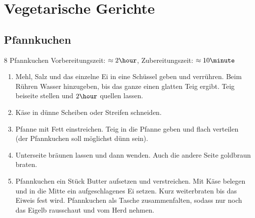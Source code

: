 \chapter{Vegetarische Gerichte}
\section{Pfannkuchen}
8 Pfannkuchen \hfill Vorbereitungszeit: $\approx 2 \hour$, Zubereitungszeit: $\approx10 \minute$
\hspace{0em}\\
\begin{enumerate}
\item   Mehl, Salz und das einzelne Ei in eine Schüssel geben und verrühren.
        Beim Rühren Wasser hinzugeben, bis das ganze einen glatten Teig ergibt.
        Teig beiseite stellen und $2 \hour$ quellen lassen.
\item   Käse in dünne Scheiben oder Streifen schneiden.
\item   Pfanne mit Fett einstreichen.
        Teig in die Pfanne geben und flach verteilen (der Pfannkuchen soll möglichst dünn sein).
\item   Unterseite bräunen lassen und dann wenden.
        Auch die andere Seite goldbraun braten.
\item   Pfannkuchen ein Stück Butter aufsetzen und verstreichen.
        Mit Käse belegen und in die Mitte ein aufgeschlagenes Ei setzen.
        Kurz weiterbraten bis das Eiweis fest wird.
        Pfannkuchen als Tasche zusammenfalten, sodass nur noch das Eigelb rausschaut
        und vom Herd nehmen.
\end{enumerate}
